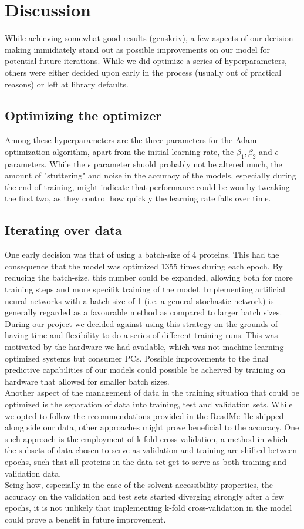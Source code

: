 \section{Discussion}
While achieving somewhat good results (genskriv), a few aspects of our decision-making immidiately stand out as possible improvements on our model for potential future iterations. While we did optimize a series of hyperparameters, others were either decided upon early in the process (usually out of practical reasons) or left at library defaults.
\subsection{Optimizing the optimizer}
Among these hyperparameters are the three parameters for the Adam optimization algorithm, apart from the initial learning rate, the $\beta_1, \beta_2$ and $\epsilon$ parameters. While the $\epsilon$ parameter shuold probably not be altered much, the amount of "stuttering" and noise in the accuracy of the models, especially during the end of training, might indicate that performance could be won by tweaking the first two, as they control how quickly the learning rate falls over time.
\subsection{Iterating over data}
One early decision was that of using a batch-size of 4 proteins. This had the consequence that the model was optimized 1355 times during each epoch. By reducing the batch-size, this number could be expanded, allowing both for more training steps and more specifik training of the model. Implementing artificial neural networks with a batch size of 1 (i.e. a general stochastic network) is generally regarded as a favourable method as compared to larger batch sizes.\\
During our project we decided against using this strategy on the grounds of having time and flexibility to do a series of different training runs. This was motivated by the hardware we had available, which was not machine-learning optimized systems but consumer PCs. Possible improvements to the final predictive capabilities of our models could possible be acheived by training on hardware that allowed for smaller batch sizes.\\
Another aspect of the management of data in the training situation that could be optimized is the separation of data into training, test and validation sets. While we opted to follow the recommendations provided in the ReadMe file shipped along side our data, other approaches might prove beneficial to the accuracy. One such approach is the employment of k-fold cross-validation, a method in which the subsets of data chosen to serve as validation and training  are shifted between epochs, such that all proteins in the data set get to serve as both training and validation data.\\
Seing how, especially in the case of the solvent accessibility properties, the accuracy on the validation and test sets started diverging strongly after a few epochs, it is not unlikely that implementing k-fold cross-validation in the model could prove a benefit in future improvement.
